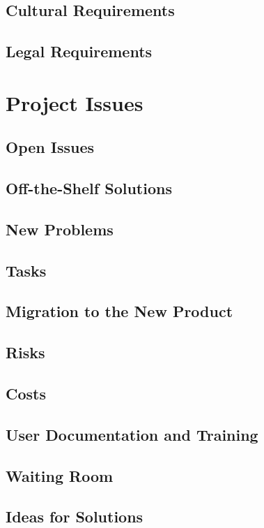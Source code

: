 \documentclass[12pt]{article}
\begin{document}
\subsection{Cultural Requirements} %
\subsection{Legal Requirements} %

\section{Project Issues}
\subsection{Open Issues} %
\subsection{Off-the-Shelf Solutions} %
\subsection{New Problems} %
\subsection{Tasks} %
\subsection{Migration to the New Product} %
\subsection{Risks} %
\subsection{Costs} %
\subsection{User Documentation and Training} %
\subsection{Waiting Room} %
\subsection{Ideas for Solutions} %
\end{document}
